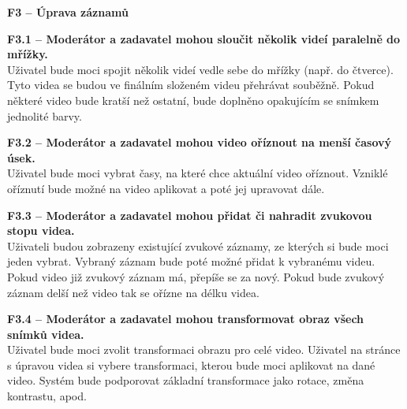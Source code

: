 \documentclass[thesis=M,czech]{FITthesis}[2012/06/26]
\begin{document}
\begin{description}
  \item \textbf{F3 -- Úprava záznamů}
  \begin{description}
    \item \textbf{F3.1 -- Moderátor a zadavatel mohou sloučit několik videí paralelně do mřížky.\\}
	Uživatel bude moci spojit několik videí vedle sebe do mřížky (např. do čtverce). Tyto videa se budou ve finálním složeném videu přehrávat souběžně. Pokud některé video bude kratší než ostatní, bude doplněno opakujícím se snímkem jednolité barvy.
    \item \textbf{F3.2 -- Moderátor a zadavatel mohou video oříznout na menší časový úsek.\\}
    Uživatel bude moci vybrat časy, na které chce aktuální video oříznout. Vzniklé oříznutí bude možné na video aplikovat a poté jej upravovat dále.
    \item \textbf{F3.3 -- Moderátor a zadavatel mohou přidat či nahradit zvukovou stopu videa.\\}
    Uživateli budou zobrazeny existující zvukové záznamy, ze kterých si bude moci jeden vybrat. Vybraný záznam bude poté možné přidat k vybranému videu. Pokud video již zvukový záznam má, přepíše se za nový. Pokud bude zvukový záznam delší než video tak se ořízne na délku videa.
    \item \textbf{F3.4 -- Moderátor a zadavatel mohou transformovat obraz všech snímků videa.\\}
	Uživatel bude moci zvolit transformaci obrazu pro celé video. Uživatel na stránce s úpravou videa si vybere transformaci, kterou bude moci aplikovat na dané video. Systém  bude podporovat základní transformace jako rotace, změna kontrastu, apod.
  \end{description}
  

\end{description}
\end{document}
